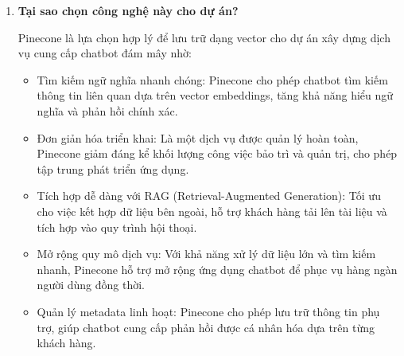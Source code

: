 \begin{enumerate}
	\item \textbf{Tại sao chọn công nghệ này cho dự án?}
	
	Pinecone là lựa chọn hợp lý để lưu trữ dạng vector cho dự án xây dựng dịch vụ cung cấp chatbot đám mây nhờ:
	\begin{itemize}
		\item Tìm kiếm ngữ nghĩa nhanh chóng: Pinecone cho phép chatbot tìm kiếm thông tin liên quan dựa trên vector embeddings, tăng khả năng hiểu ngữ nghĩa và phản hồi chính xác.
		\item Đơn giản hóa triển khai: Là một dịch vụ được quản lý hoàn toàn, Pinecone giảm đáng kể khối lượng công việc bảo trì và quản trị, cho phép tập trung phát triển ứng dụng.
		\item Tích hợp dễ dàng với RAG (Retrieval-Augmented Generation): Tối ưu cho việc kết hợp dữ liệu bên ngoài, hỗ trợ khách hàng tải lên tài liệu và tích hợp vào quy trình hội thoại.
		\item Mở rộng quy mô dịch vụ: Với khả năng xử lý dữ liệu lớn và tìm kiếm nhanh, Pinecone hỗ trợ mở rộng ứng dụng chatbot để phục vụ hàng ngàn người dùng đồng thời.
		\item Quản lý metadata linh hoạt: Pinecone cho phép lưu trữ thông tin phụ trợ, giúp chatbot cung cấp phản hồi được cá nhân hóa dựa trên từng khách hàng.

	\end{itemize}
	
\end{enumerate}
\renewcommand{\labelenumi}{\arabic{enumi}.}

